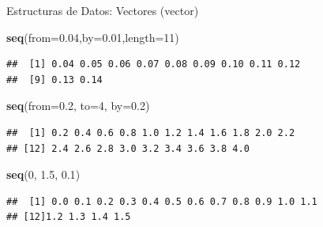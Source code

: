 \documentclass[ignorenonframetext,]{beamer}
\newenvironment{Shaded}{\begin{snugshade}}{\end{snugshade}}
\newcommand{\KeywordTok}[1]{\textcolor[rgb]{0.13,0.29,0.53}{\textbf{#1}}}
\newcommand{\DataTypeTok}[1]{\textcolor[rgb]{0.13,0.29,0.53}{#1}}
\newcommand{\DecValTok}[1]{\textcolor[rgb]{0.00,0.00,0.81}{#1}}
\newcommand{\FloatTok}[1]{\textcolor[rgb]{0.00,0.00,0.81}{#1}}
\newcommand{\NormalTok}[1]{#1}
\begin{document}
\begin{frame}[fragile]{Estructuras de Datos: Vectores (vector)}

\begin{Shaded}
\begin{Highlighting}[]
\KeywordTok{seq}\NormalTok{(}\DataTypeTok{from=}\FloatTok{0.04}\NormalTok{,}\DataTypeTok{by=}\FloatTok{0.01}\NormalTok{,}\DataTypeTok{length=}\DecValTok{11}\NormalTok{)}
\end{Highlighting}
\end{Shaded}

\begin{verbatim}
##  [1] 0.04 0.05 0.06 0.07 0.08 0.09 0.10 0.11 0.12
##  [9] 0.13 0.14
\end{verbatim}

\begin{Shaded}
\begin{Highlighting}[]
\KeywordTok{seq}\NormalTok{(}\DataTypeTok{from=}\FloatTok{0.2}\NormalTok{, }\DataTypeTok{to=}\DecValTok{4}\NormalTok{, }\DataTypeTok{by=}\FloatTok{0.2}\NormalTok{)}
\end{Highlighting}
\end{Shaded}

\begin{verbatim}
##  [1] 0.2 0.4 0.6 0.8 1.0 1.2 1.4 1.6 1.8 2.0 2.2
## [12] 2.4 2.6 2.8 3.0 3.2 3.4 3.6 3.8 4.0
\end{verbatim}

\begin{Shaded}
\begin{Highlighting}[]
\KeywordTok{seq}\NormalTok{(}\DecValTok{0}\NormalTok{, }\FloatTok{1.5}\NormalTok{, }\FloatTok{0.1}\NormalTok{)}
\end{Highlighting}
\end{Shaded}

\begin{verbatim}
##  [1] 0.0 0.1 0.2 0.3 0.4 0.5 0.6 0.7 0.8 0.9 1.0 1.1 
## [12]1.2 1.3 1.4 1.5
\end{verbatim}

\end{frame}
\end{document}
